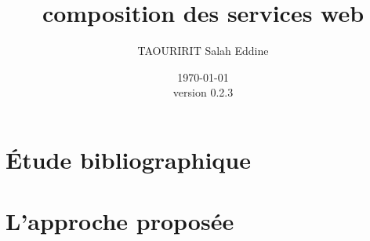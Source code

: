 \documentclass[a4paper, oneside, 12pt]{report}
\author{TAOURIRIT Salah Eddine}
\title{composition des services web}
\date{\today\\version 0.2.3}
\begin{document}
\let\Item\item
\newcommand{\head}[1]{\textnormal{\textbf{#1}}}
\newcommand\SpecialItem{\renewcommand\item[1][]{\Item[\textbullet~\sffamily ##1]}}
\renewcommand\enddescription{\endlist\global\let\item\Item}
\renewcommand{\descriptionlabel}[1]{\hspace{1cm}\textsf{#1}} 
\newtheorem{mydef}{Definition}

\maketitle 

\setcounter{secnumdepth}{4}
\setcounter{tocdepth}{4}

\tableofcontents

\printglossaries
\listoffigures
\listoftables



\part{Étude bibliographique}




\part{L'approche proposée}




\end{document}

